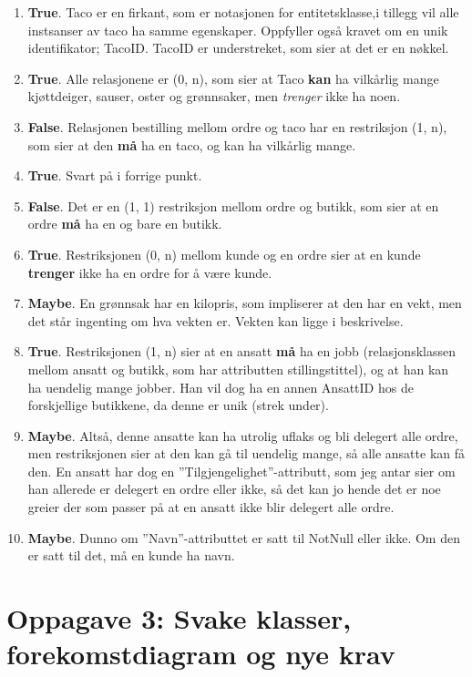\documentclass[12pt,a4paper]{article}
\begin{document}
			\begin{enumerate}
				\item \textbf{True}. Taco er en firkant, som er notasjonen for entitetsklasse,i tillegg vil alle instsanser av taco ha samme egenskaper. Oppfyller 								også kravet om en unik identifikator; TacoID. TacoID er understreket, som sier at det er en nøkkel.
				\item \textbf{True}. Alle relasjonene er (0, n), som sier at Taco \textbf{kan} ha vilkårlig mange kjøttdeiger, sauser, oster og grønnsaker, men 									\textit{trenger} ikke ha noen.
				\item \textbf{False}. Relasjonen bestilling mellom ordre og taco har en restriksjon (1, n), som sier at den \textbf{må} ha en taco, og kan ha vilkårlig 						mange.
				\item \textbf{True}. Svart på i forrige punkt.
				\item \textbf{False}. Det er en (1, 1) restriksjon mellom ordre og butikk, som sier at en ordre \textbf{må} ha en og bare en butikk.
				\item \textbf{True}. Restriksjonen (0, n) mellom kunde og en ordre sier at en kunde \textbf{trenger} ikke ha en ordre for å være kunde.
				\item \textbf{Maybe}. En grønnsak har en kilopris, som impliserer at den har en vekt, men det står ingenting om hva vekten er. Vekten kan ligge i 							beskrivelse.
				\item \textbf{True}. Restriksjonen (1, n) sier at en ansatt \textbf{må} ha en jobb (relasjonsklassen mellom ansatt og butikk, som har attributten 								stillingstittel), og at han kan ha uendelig mange jobber. Han vil dog ha en annen AnsattID hos de forskjellige butikkene, da denne er unik 								(strek under).
				\item \textbf{Maybe}. Altså, denne ansatte kan ha utrolig uflaks og bli delegert alle ordre, men restriksjonen sier at den kan gå til uendelig mange, 						så alle ansatte kan få den. En ansatt har dog en ''Tilgjengelighet''-attributt, som jeg antar sier om han allerede er delegert en ordre eller 								ikke, så det kan jo hende det er noe greier der som passer på at en ansatt ikke blir delegert alle ordre. 
				\item \textbf{Maybe}. Dunno om ''Navn''-attributtet er satt til NotNull eller ikke. Om den er satt til det, må en kunde ha navn. 
			\end{enumerate}
					
			
	\section{Oppagave 3: Svake klasser, forekomstdiagram og nye krav}
\end{document}
